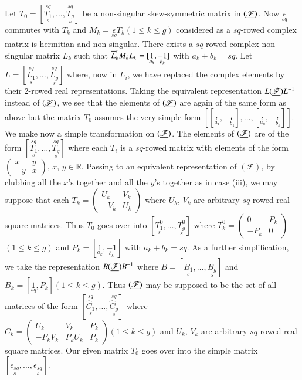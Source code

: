 Let
$T_{0}=[\overset{sq}{\underset{s}{T_{1}}},\ldots,\overset{sq}{\underset{s}{T_{g}}}]$ 
be a non-singular skew-symmetric matrix in $(\underline{\mathscr{F}})$. Now
$\underset{sq}{\epsilon}$ commutes with $T_{k}$ and
$M_{k}=\underset{sq}{\epsilon}T_{k}(1\leq k\leq g)$ considered as a
$sq$-rowed complex matrix is hermitian and non-singular. There exists
a $sq$-rowed complex non-singular matrix $L_{k}$ such that
$\overline{L}'_{k}M_{k}L_{k}=[\underset{a_{k}}{1},\underset{b_{k}}{-1}]$
with $a_{k}+b_{k}=sq$. Let
$L=[\overset{sq}{\underset{s}{L_{1}}},\ldots,\overset{sq}{\underset{s}{L_{g}}}]$
where, now in $L_{i}$, we have replaced the complex elements by their
$2$-rowed real representations. Taking the equivalent representation 
$L(\underline{\mathscr{F}})L^{-1}$\pageoriginale instead of
$(\underline{\mathscr{F}})$, we see that the elements of $(\underline{\mathscr{F}})$
are again of the same form as above but the matrix $T_{0}$ assumes the
very simple form
$\left[[\underset{a_{1}}{\epsilon},-\underset{b_{1}}{\epsilon}],\ldots,
[\underset{a_{h}}{\epsilon},-\underset{b_{h}}{\epsilon}]\right]$. We
make now a simple transformation on $(\underline{\mathscr{F}})$. The elements
of $(\underline{\mathscr{F}})$ are of the form
$[\underset{s}{\overset{sq}{T_{1}}},\ldots,\underset{s}{\overset{sq}{T_{g}}}]$
where each $T_{i}$ is a $sq$-rowed matrix with elements of the form
$\left(\begin{smallmatrix} x & y\\ -y & x
\end{smallmatrix}\right)$, $x$, $y\in\mathbb{R}$. Passing to an
equivalent representation of $(\mathscr{F})$, by clubbing all the
$x$'s together and all the $y$'s together as in case (iii), we may
suppose that each $T_{k}=\left(\begin{smallmatrix} U_{k} &
  V_{k}\\ -V_{k} & U_{k}
\end{smallmatrix}\right)$ where $U_{k}$, $V_{k}$ are arbitrary
$sq$-rowed real square matrices. Thus $T_{0}$ goes over into
$[\underset{s}{T^{0}_{1}},\ldots,\underset{s}{T^{0}_{g}}]$ where
$T^{0}_{k}=\left(\begin{smallmatrix} 0 & P_{k}\\ -P_{k} & 0
\end{smallmatrix}\right)$ $(1\leq k\leq g)$ and
$P_{k}=[\underset{a_{k}}{1},\underset{b_{k}}{-1}]$ with
$a_{k}+b_{k}=sq$. As a further simplification, we take the
representation $B(\underline{\mathscr{F}})B^{-1}$ where
$B=[\underset{s}{B_{1}},\ldots,\underset{s}{B_{g}}]$ and
$B_{k}=[\underset{sq}{1},P_{k}](1\leq k\leq g)$. Thus
$(\underline{\mathscr{F}})$ may be supposed to be the set of all matrices of
the form $[\underset{s}{\overset{sq}{\widehat{C}_{1}}},\ldots,
  \underset{s}{\overset{sq}{\widehat{C}_{g}}}]$ where
$\widehat{C}_{k}=\left(
\begin{smallmatrix} U_{k} & V_{k} & P_{k}\\ -P_{k}V_{k} & P_{k}U_{k} &
  P_{k}
\end{smallmatrix}\right)(1\leq k\leq g)$ and $U_{k}$, $V_{k}$ are
arbitrary $sq$-rowed real square matrices. Our given matrix $T_{0}$
goes over into the simple matrix
$[\underset{s}{\epsilon_{sq}},\ldots,\underset{s}{\epsilon_{sq}}]$. 

